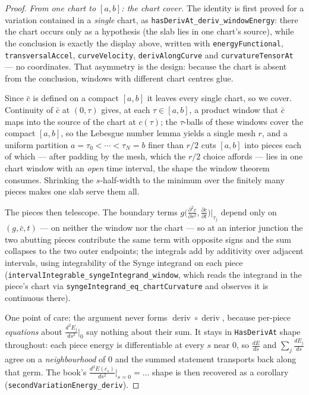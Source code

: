 \begin{proof}
  \leanok
  \emph{From one chart to $[a,b]$: the chart cover.} The identity is first proved for a
  variation contained in a \emph{single} chart, as \texttt{hasDerivAt\_deriv\_windowEnergy}:
  there the chart occurs only as a hypothesis (the slab lies in one chart's source), while the
  conclusion is exactly the display above, written with \texttt{energyFunctional},
  \texttt{transversalAccel}, \texttt{curveVelocity}, \texttt{derivAlongCurve} and
  \texttt{curvatureTensorAt} — no coordinates. That asymmetry is the design: because the chart
  is absent from the conclusion, windows with different chart centres glue.

  Since $\bar c$ is defined on a compact $[a,b]$ it leaves every single chart, so we cover.
  Continuity of $\bar c$ at $(0,\tau)$ gives, at each $\tau\in[a,b]$, a product window that
  $\bar c$ maps into the source of the chart at $c(\tau)$; the $\tau$-balls of these windows
  cover the compact $[a,b]$, so the Lebesgue number lemma yields a single mesh $r$, and a
  uniform partition $a=\tau_0<\cdots<\tau_N=b$ finer than $r/2$ cuts $[a,b]$ into pieces each
  of which — after padding by the mesh, which the $r/2$ choice affords — lies in one chart
  window with an \emph{open} time interval, the shape the window theorem consumes. Shrinking
  the $s$-half-width to the minimum over the finitely many pieces makes one slab serve them all.

  The pieces then telescope. The boundary terms
  $g\big(\frac{\partial^2c}{\partial s^2},\frac{\partial c}{\partial t}\big)\big|_{\tau_j}$
  depend only on $(g,\bar c,t)$ — on neither the window nor the chart — so at an interior
  junction the two abutting pieces contribute the same term with opposite signs and the sum
  collapses to the two outer endpoints; the integrals add by additivity over adjacent
  intervals, using integrability of the Synge integrand on each piece
  (\texttt{intervalIntegrable\_syngeIntegrand\_window}, which reads the integrand in the piece's
  chart via \texttt{syngeIntegrand\_eq\_chartCurvature} and observes it is continuous there).

  One point of care: the argument never forms
  $\operatorname{deriv}\circ\operatorname{deriv}$, because per-piece \emph{equations} about
  $\frac{d^2E_j}{ds^2}\big|_0$ say nothing about their sum. It stays in \texttt{HasDerivAt}
  shape throughout: each piece energy is differentiable at every $s$ near $0$, so
  $\frac{dE}{ds}$ and $\sum_j\frac{dE_j}{ds}$ agree on a \emph{neighbourhood} of $0$ and the
  summed statement transports back along that germ. The book's
  $\frac{d^2E(c_s)}{ds^2}\big|_{s=0}=\dots$ shape is then recovered as a corollary
  (\texttt{secondVariationEnergy\_deriv}).


\end{proof}
